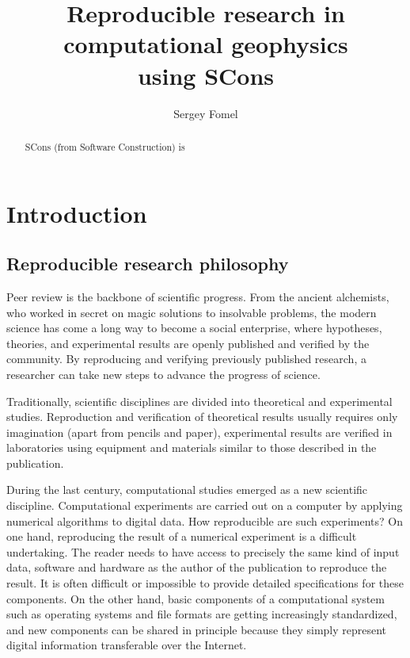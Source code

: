 \title{Reproducible research in computational geophysics \\ using SCons}

\author{Sergey Fomel}

\maketitle

\begin{abstract}
SCons (from Software Construction) is
\end{abstract}

\section{Introduction}

\subsection{Reproducible research philosophy}

Peer review is the backbone of scientific progress. From the ancient
alchemists, who worked in secret on magic solutions to insolvable problems,
the modern science has come a long way to become a social enterprise, where
hypotheses, theories, and experimental results are openly published and
verified by the community. By reproducing and verifying previously published
research, a researcher can take new steps to advance the progress of science.

Traditionally, scientific disciplines are divided into theoretical and
experimental studies. Reproduction and verification of theoretical results
usually requires only imagination (apart from pencils and paper),
experimental results are verified in laboratories using equipment and
materials similar to those described in the publication.

During the last century, computational studies emerged as a new scientific
discipline. Computational experiments are carried out on a computer by
applying numerical algorithms to digital data. How reproducible are such
experiments? On one hand, reproducing the result of a numerical experiment is
a difficult undertaking. The reader needs to have access to precisely the
same kind of input data, software and hardware as the author of the
publication to reproduce the result. It is often difficult or impossible to
provide detailed specifications for these components. On the other hand, basic
components of a computational system such as operating systems and file
formats are getting increasingly standardized, and new components can be
shared in principle because they simply represent digital information
transferable over the Internet.

